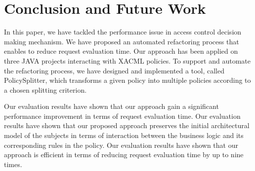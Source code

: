 \section{Conclusion and Future Work} \label{sec:conclusion}

In this paper, we have tackled the performance issue in access control decision making mechanism.
We have proposed an
 automated refactoring  process  
that enables to reduce request evaluation time.
Our approach has been applied on three JAVA projects interacting with XACML policies.
To support and automate the refactoring process, we have designed and implemented a tool, called PolicySplitter,
which transforms a given policy into multiple policies according to a chosen splitting criterion.

Our evaluation results have shown that our approach gain a significant performance improvement
in terms of request evaluation time.
Our evaluation results have shown that our proposed approach
preserves the initial architectural model of the subjects in terms of interaction between the business logic and its corresponding
rules in the policy. Our evaluation results have shown that our approach
is efficient in terms of reducing request evaluation time by up to nine times. 


